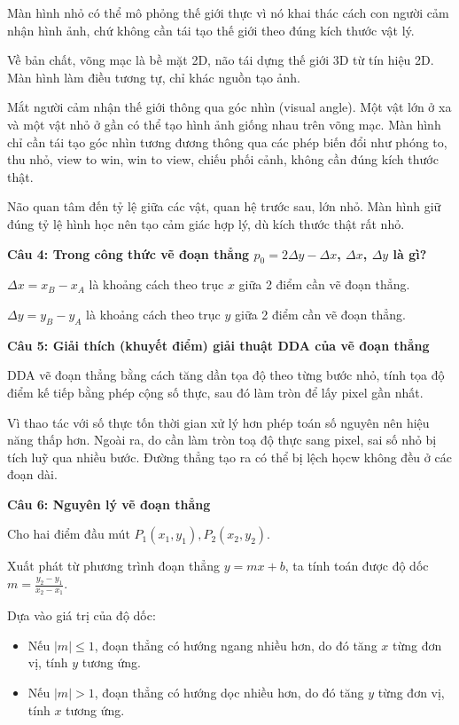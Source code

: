 Màn hình nhỏ có thể mô phỏng thế giới thực vì nó khai thác cách con người cảm nhận hình ảnh, chứ không cần tái tạo thế giới theo đúng kích thước vật lý.

Về bản chất, võng mạc là bề mặt 2D, não tái dựng thế giới 3D từ tín hiệu 2D. Màn hình làm điều tương tự, chỉ khác nguồn tạo ảnh.

Mắt người cảm nhận thế giới thông qua góc nhìn (visual angle). Một vật lớn ở xa và một vật nhỏ ở gần có thể tạo hình ảnh giống nhau trên võng mạc. Màn hình chỉ cần tái tạo góc nhìn tương đương thông qua các phép biến đổi như phóng to, thu nhỏ, view to win, win to view, chiếu phối cảnh, không cần đúng kích thước thật.

Não quan tâm đến tỷ lệ giữa các vật, quan hệ trước sau, lớn nhỏ. Màn hình giữ đúng tỷ lệ hình học nên tạo cảm giác hợp lý, dù kích thước thật rất nhỏ.

\textbf{Câu 4: Trong công thức vẽ đoạn thẳng $p_0 = 2 \Delta y - \Delta x$, $\Delta x$, $\Delta y$ là gì?}

$\Delta x = x_B - x_A$ là khoảng cách theo trục $x$ giữa 2 điểm cần vẽ đoạn thẳng.

$\Delta y = y_B - y_A$ là khoảng cách theo trục $y$ giữa 2 điểm cần vẽ đoạn thẳng.

\textbf{Câu 5: Giải thích (khuyết điểm) giải thuật DDA của vẽ đoạn thẳng}

DDA vẽ đoạn thẳng bằng cách tăng dần tọa độ theo từng bước nhỏ, tính tọa độ điểm kế tiếp bằng phép cộng số thực, sau đó làm tròn để lấy pixel gần nhất.

Vì thao tác với số thực tốn thời gian xử lý hơn phép toán số nguyên nên hiệu năng thấp hơn. Ngoài ra, do cần làm tròn toạ độ thực sang pixel, sai số nhỏ bị tích luỹ qua nhiều bước. Đường thẳng tạo ra có thể bị lệch họcw không đều ở các đoạn dài.

\textbf{Câu 6: Nguyên lý vẽ đoạn thẳng}

Cho hai điểm đầu mút $P_1 (x_1, y_1), P_2 (x_2, y_2)$.

Xuất phát từ phương trình đoạn thẳng $y = mx + b$, ta tính toán được độ dốc $m = \frac{y_2 - y_1}{x_2 - x_1}$.

Dựa vào giá trị của độ dốc:
\begin{itemize}
	\item Nếu $|m| \le 1$, đoạn thẳng có hướng ngang nhiều hơn, do đó tăng $x$ từng đơn vị, tính $y$ tương ứng.
	
	\item Nếu $|m| > 1$, đoạn thẳng có hướng dọc nhiều hơn, do đó tăng $y$ từng đơn vị, tính $x$ tương ứng.
\end{itemize}

